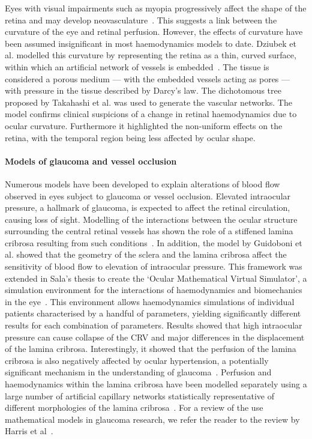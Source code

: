 \documentclass{article}
\begin{document}
Eyes with visual impairments such as myopia progressively affect the shape of the retina and may develop neovasculature~\cite{Medina_2016}.
This suggests a link between the curvature of the eye and retinal perfusion.
However, the effects of curvature have been assumed insignificant in most haemodynamics models to date.
Dziubek et al. modelled this curvature by representing the retina as a thin, curved surface, within which an artificial network of vessels is embedded~\cite{Dziubek_2015}.
The tissue is considered a porous medium --- with the embedded vessels acting as pores --- with pressure in the tissue described by Darcy's law.
The dichotomous tree proposed by Takahashi et al. was used to generate the vascular networks.
The model confirms clinical suspicions of a change in retinal haemodynamics due to ocular curvature.
Furthermore it highlighted the non-uniform effects on the retina, with the temporal region being less affected by ocular shape\cite{Dziubek_2015}.

\paragraph*{Models of glaucoma and vessel occlusion}

Numerous models have been developed to explain alterations of blood flow observed in eyes subject to glaucoma or vessel occlusion\cite{Chuangsuwanich_2016,Guidoboni_2014,Sala_2018,Sala_2020}.
Elevated intraocular pressure, a hallmark of glaucoma, is expected to affect the retinal circulation, causing loss of sight.
Modelling of the interactions between the ocular structure surrounding the central retinal vessels has shown the role of a stiffened lamina cribrosa resulting from such conditions~\cite{Guidoboni_2014}.
In addition, the model by Guidoboni et al. showed that the geometry of the sclera and the lamina cribrosa affect the sensitivity of blood flow to elevation of intraocular pressure.
This framework was extended in Sala's thesis to create the `Ocular Mathematical Virtual Simulator', a simulation environment for the interactions of haemodynamics and biomechanics in the eye~\cite{Sala_2018,Sala_2020}.
This environment allows haemodynamics simulations of individual patients characterised by a handful of parameters, yielding significantly different results for each combination of parameters.
Results showed that high intraocular pressure can cause collapse of the CRV and major differences in the displacement of the lamina cribrosa.
Interestingly, it showed that the perfusion of the lamina cribrosa is also negatively affected by ocular hypertension, a potentially significant mechanism in the understanding of glaucoma~\cite{Sala_2020}.
Perfusion and haemodynamics within the lamina cribrosa have been modelled separately using a large number of artificial capillary networks statistically representative of different morphologies of the lamina cribrosa~\cite{Chuangsuwanich_2016}.
For a review of the use mathematical models in glaucoma research, we refer the reader to the review by Harris et al~\cite{Harris_2013}.
\end{document}
